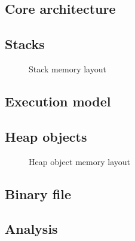 
\subsection{Core architecture}

\subsection{Stacks}

\begin{figure}[h]
  \centering
  
  \caption{Stack memory layout}
\end{figure}

\subsection{Execution model}

\subsection{Heap objects}

\begin{figure}[h]
  \centering
  
  \caption{Heap object memory layout}
\end{figure}

\subsection{Binary file}








\subsection{Analysis}

